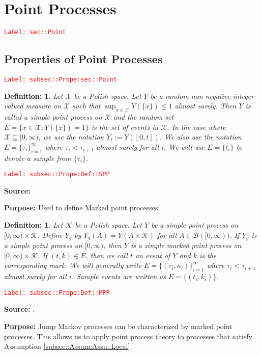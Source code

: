 \documentclass[12pt]{article}
\newcommand{\mc}{\mathcal}
\newcommand{\ms}{\mathscr}
\newcommand{\tr}{\textcolor{red}}
\newcommand{\labe}[1]{\tr{\texttt{Label: #1}}}
\newcommand{\purpose}{\textbf{Purpose: }}
\newtheorem{defn}[thms]{Definition: }
\begin{document}
\section{Point Processes}
\label{sec::Point}\labe{sec::Point}

\subsection{Properties of Point Processes}
\label{subsec::Prope:sec::Point}\labe{subsec::Prope:sec::Point}

\begin{defn}
Let \(\mc{X}\) be a Polish space. Let \(Y\) be a random non-negative integer valued measure on \(\mc{X}\) such that \(\sup_{x \in \mc{X}} Y(\{x\})\leq 1\) almost surely. Then \(Y\) is called a simple point process on \(\mc{X}\) and the random set \(E = \{x \in \mc{X}: Y(\{x\}) = 1\}\) is the set of events in \(\mc{X}\). In the case where \(\mc{X} \subseteq [0,\infty)\), we use the notation \(Y_t := Y([0,t])\). We also use the notation \(E = \{\tau_i\}_{i=1}^{\infty}\) where \(\tau_i < \tau_{i+1}\) almost surely for all \(i\). We will use \(E = \{t_i\}\) to denote a sample from \(\{\tau_i\}\).
\label{subsec::Prope:Def::SPP}
\end{defn}
\labe{subsec::Prope:Def::SPP}

\textbf{Source: }\cite[Definition 9.1.II]{DalVer08}

\purpose Used to define Marked point processes.

\begin{defn}
Let \(\mc{K}\) be a Polish space. Let \(Y\) be a simple point process on \([0,\infty)\times \mc{K}\). Define \(Y_g\) by \(Y_g(A) = Y(A\times \mc{K})\) for all \(A \in \ms{B}([0,\infty))\). If \(Y_g\) is a simple point process on \([0,\infty)\), then \(Y\) is a simple marked point process on \([0,\infty)\times \mc{K}\). If \((t,k) \in E\), then we call \(t\) an event of \(Y\) and \(k\) is the corresponding mark. We will generally write \(E = \{(\tau_i,\kappa_i)\}_{i=1}^{\infty}\) where \(\tau_i < \tau_{i+1}\) almost surely for all \(i\). Sample events are written as \(E = \{(t_i,k_i)\}\). 
\label{subsec::Prope:Def::MPP}
\end{defn}
\labe{subsec::Prope:Def::MPP}

\textbf{Source: }\cite[Definition 6.4.I]{DalVer03}.

\purpose Jump Markov processes can be characterized by marked point processes. This allows us to apply point process theory to processes that satisfy Assumption \ref{subsec::Assum:Assu::Local}.
\end{document}
